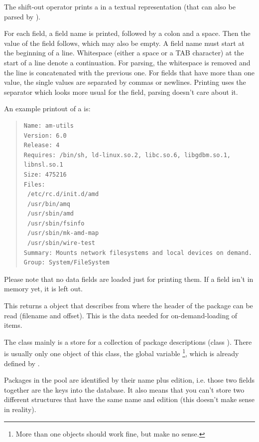 \documentclass[10pt]{article}
\begin{document}
The shift-out operator prints a  in a textual
representation (that can also be parsed by ).

For each field, a field name is printed, followed by a colon and a
space. Then the value of the field follows, which may also be empty. A
field name must start at the beginning of a line. Whitespace (either a
space or a TAB character) at the start of a line denote a
continuation. For parsing, the whitespace is removed and the line is
concatenated with the previous one. For fields that have more than one
value, the single values are separated by commas or newlines. Printing
uses the separator which looks more usual for the field, parsing
doesn't care about it.

An example printout of a  is:
\begin{quote}
\begin{verbatim}
Name: am-utils
Version: 6.0
Release: 4
Requires: /bin/sh, ld-linux.so.2, libc.so.6, libgdbm.so.1, libnsl.so.1
Size: 475216
Files:
 /etc/rc.d/init.d/amd
 /usr/bin/amq
 /usr/sbin/amd
 /usr/sbin/fsinfo
 /usr/sbin/mk-amd-map
 /usr/sbin/wire-test
Summary: Mounts network filesystems and local devices on demand.
Group: System/FileSystem
\end{verbatim}
\end{quote}

Please note that no data fields are loaded just for printing them. If
a field isn't in memory yet, it is left out.

This returns a  object that describes from where
the header of the package can be read (filename and offset). This is
the data needed for on-demand-loading of items.




The  class mainly is a store for a collection of package
descriptions (class ). There is usually only one object
of this class, the global variable \footnote{
  More than one  objects should work fine, but make no
  sense.},
which is already defined by .

Packages in the pool are identified by their name plus edition, i.e.
those two fields together are the keys into the database. It also
means that you can't store two different  structures
that have the same name and edition (this doesn't make sense in
reality).
\end{document}
